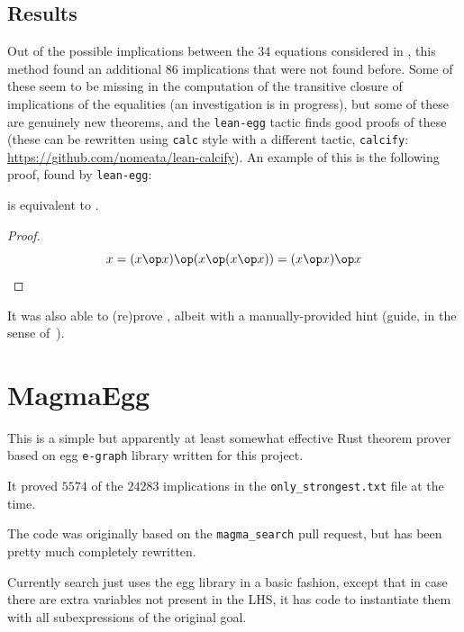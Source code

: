 \subsection{Results}

Out of the possible implications between the $34$ equations considered in , this method found an additional 86 implications that were not found before.
Some of these seem to be missing in the computation of the transitive closure of implications of the equalities (an investigation is in progress), but some of these are genuinely new theorems, and the \texttt{lean-egg} tactic finds good proofs of these (these can be rewritten using \texttt{calc} style with a different tactic, \texttt{calcify}: \url{https://github.com/nomeata/lean-calcify}). An example of this is the following proof, found by \texttt{lean-egg}:

\begin{theorem}[14 implies 23]\label{14_implies_23} \leanok  {} is equivalent to .
\end{theorem}

\begin{proof}\leanok

$$ x = (x \op x) \op (x \op (x \op x)) = (x \op x) \op x $$
\end{proof}

It was also able to (re)prove , albeit with a manually-provided hint (guide, in the sense of~\cite{DBLP:journals/pacmpl/KoehlerGBGTS24}).

\section{MagmaEgg}

This is a simple but apparently at least somewhat effective Rust theorem prover based on egg \texttt{e-graph} library written for this project.

It proved $5574$ of the $24283$ implications in the \texttt{only\_strongest.txt} file at the time.

The code was originally based on the \texttt{magma\_search} pull request, but has been pretty much completely rewritten.

Currently search just uses the egg library in a basic fashion, except that in case there are extra variables not present in the LHS, it has code to instantiate them with all subexpressions of the original goal.

